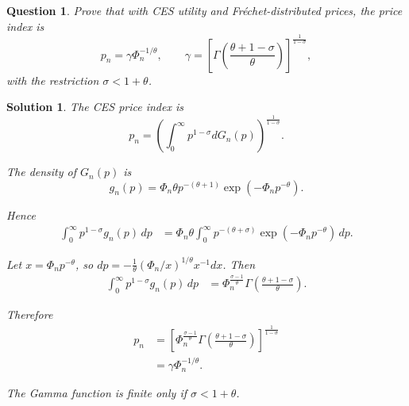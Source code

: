 \documentclass[12pt]{article}
\newtheorem{question}{Question}
\newtheorem*{solution}{Solution}
\begin{document}
\begin{question}
Prove that with CES utility and Fréchet-distributed prices, the price index is
\[
p_n = \gamma \Phi_n^{-1/\theta}, \qquad 
\gamma = \left[\Gamma\!\left(\frac{\theta+1-\sigma}{\theta}\right)\right]^{\frac{1}{1-\sigma}},
\]
with the restriction $\sigma < 1+\theta$.
\end{question}

\begin{solution}
The CES price index is
\[
p_n = \left( \int_0^\infty p^{1-\sigma} dG_n(p) \right)^{\tfrac{1}{1-\sigma}}.
\]

The density of $G_n(p)$ is
\[
g_n(p) = \Phi_n \theta p^{-(\theta+1)} \exp(-\Phi_n p^{-\theta}).
\]

Hence
\begin{align*}
\int_0^\infty p^{1-\sigma} g_n(p)\, dp
&= \Phi_n \theta \int_0^\infty p^{-(\theta+\sigma)} 
    \exp(-\Phi_n p^{-\theta})\, dp.
\end{align*}

Let $x = \Phi_n p^{-\theta}$, so $dp = -\tfrac{1}{\theta} (\Phi_n/x)^{1/\theta} x^{-1} dx$. Then
\begin{align*}
\int_0^\infty p^{1-\sigma} g_n(p)\, dp
&= \Phi_n^{\tfrac{\sigma-1}{\theta}} 
   \Gamma\!\left(\tfrac{\theta+1-\sigma}{\theta}\right).
\end{align*}

Therefore
\begin{align*}
p_n &= \left[\Phi_n^{\tfrac{\sigma-1}{\theta}} 
   \Gamma\!\left(\tfrac{\theta+1-\sigma}{\theta}\right)\right]^{\tfrac{1}{1-\sigma}} \\
&= \gamma \Phi_n^{-1/\theta}.
\end{align*}

The Gamma function is finite only if $\sigma < 1 + \theta$.
\end{solution}
\end{document}
